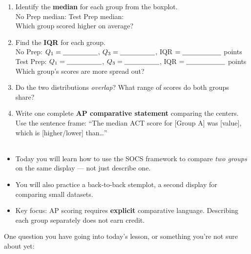 \documentclass[10pt]{article}
\begin{document}
\vspace{0.22in}

\begin{enumerate}[leftmargin=1.5em, itemsep=10pt]

  \item Identify the \textbf{median} for each group from the boxplot.\\[6pt]
        No Prep median: \blank{2cm} \quad Test Prep median: \blank{2cm}\\[4pt]
        Which group scored higher on average? \blank{5cm}

  \item Find the \textbf{IQR} for each group.\\[6pt]
        No Prep: $Q_1 = \blank{1.8cm}$, $Q_3 = \blank{1.8cm}$,
        IQR $= \blank{2cm}$ points\\[4pt]
        Test Prep: $Q_1 = \blank{1.8cm}$, $Q_3 = \blank{1.8cm}$,
        IQR $= \blank{2cm}$ points\\[4pt]
        Which group's scores are more spread out? \blank{5cm}

  \item Do the two distributions \textit{overlap}? What range of scores do
        both groups share?\\[6pt]
        \writeline

  \item Write one complete \textbf{AP comparative statement} comparing the
        centers. Use the sentence frame: ``The median ACT score for
        [Group A] was [value], which is [higher/lower] than\ldots''\\[6pt]
        \writeline\\[1pt]\writeline

\end{enumerate}

\vspace{0.14in}

\begin{tcolorbox}[colback=greenbg, colframe=greenacc, boxrule=0.8pt, arc=2mm,
    left=4mm, right=4mm, top=3mm, bottom=3mm]
\small
\begin{itemize}[leftmargin=1.3em, itemsep=5pt]
  \item Today you will learn how to use the SOCS framework to compare
        \textit{two groups} on the same display --- not just describe one.
  \item You will also practice a back-to-back stemplot, a second display
        for comparing small datasets.
  \item Key focus: AP scoring requires \textbf{explicit} comparative
        language. Describing each group separately does not earn credit.
\end{itemize}
\end{tcolorbox}

\vspace{0.12in}

\noindent\textcolor{slate}{\small One question you have going into today's lesson,
or something you're not sure about yet:}\\[8pt]
\writeline
\end{document}
